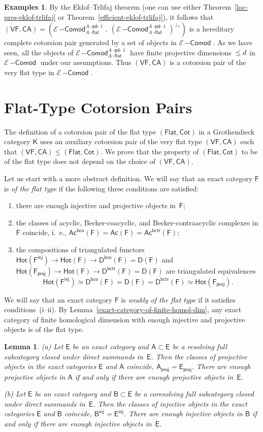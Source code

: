 \documentclass[12pt,a4paper]{amsart}
\newcommand{\+}{\nobreakdash-}
\renewcommand{\:}{\colon}
\newcommand{\rarrow}{\longrightarrow}
\newcommand{\Comodl}{{\operatorname{\mathsf{--Comod}}}}
\newcommand{\sA}{\mathsf A}
\newcommand{\sB}{\mathsf B}
\newcommand{\sD}{\mathsf D}
\newcommand{\sE}{\mathsf E}
\newcommand{\sF}{\mathsf F}
\newcommand{\sK}{\mathsf K}
\newcommand{\cE}{\mathcal E}
\newcommand{\VF}{\mathsf{VF}}
\newcommand{\CA}{\mathsf{CA}}
\newcommand{\Flat}{\mathsf{Flat}}
\newcommand{\Cot}{\mathsf{Cot}}
\newcommand{\Hot}{\mathsf{Hot}}
\newcommand{\Ac}{\mathsf{Ac}}
\newcommand{\proj}{\mathsf{proj}}
\newcommand{\inj}{\mathsf{inj}}
\newcommand{\bco}{\mathsf{bco}}
\newcommand{\bctr}{\mathsf{bctr}}
\newcommand{\dpdo}{{{\operatorname{\mathsf{-pd-}}}1}}
\newcommand{\dflat}{{\operatorname{\mathsf{-flat}}}}
\newcommand{\Section}[1]{\bigskip\section{#1}\medskip}
\theoremstyle{plain}
\newtheorem{lem}[thm]{Lemma}
\theoremstyle{definition}
\newtheorem{exs}[thm]{Examples}
\begin{document}
\begin{exs}
 By the Eklof--Trlifaj theorem (one can use either
Theorem~\ref{loc-pres-eklof-trlifaj} or
Theorem~\ref{efficient-eklof-trlifaj}), it follows that
$(\VF,\CA)=(\cE\Comodl^{A\dpdo}_{A\dflat},\allowbreak\>
(\cE\Comodl^{A\dpdo}_{A\dflat})^{\perp_1})$ is a hereditary complete
cotorsion pair generated by a set of objects in $\cE\Comodl$.
 As we have seen, all the objects of $\cE\Comodl^{A\dpdo}_{A\dflat}$
have finite projective dimensions~$\le\nobreak d$ in $\cE\Comodl$
under our assumptions.
 Thus $(\VF,\CA)$ is a cotorsion pair of the very flat type in
$\cE\Comodl$.
\end{exs}


\Section{Flat-Type Cotorsion Pairs}  \label{flat-type-secn}

 The definition of a cotorsion pair of the flat type $(\Flat,\Cot)$ in
a Grothendieck category $\sK$ uses an auxiliary cotorsion pair of
the very flat type $(\VF,\CA)$ such that $(\VF,\CA)\le(\Flat,\Cot)$.
 We prove that the property of $(\Flat,\Cot)$ to be of the flat type
does not depend on the choice of $(\VF,\CA)$.

 Let us start with a more abstract definition.
 We will say that an exact category $\sF$ is \emph{of the flat type} if
the following three conditions are satisfied:
\begin{enumerate}
\renewcommand{\theenumi}{\roman{enumi}}
\item there are enough injective and projective objects in~$\sF$;
\item the classes of acyclic, Becker-coacyclic, and
Becker-contraacyclic complexes in $\sF$ coincide, i.~e.,
$\Ac^\bco(\sF)=\Ac(\sF)=\Ac^\bctr(\sF)$;
\item the compositions of triangulated functors
$\Hot(\sF^\inj)\rarrow\Hot(\sF)\rarrow\sD^\bco(\sF)=\sD(\sF)$
and $\Hot(\sF_\proj)\rarrow\Hot(\sF)\rarrow\sD^\bctr(\sF)=\sD(\sF)$
are triangulated equivalences
$$
 \Hot(\sF^\inj)\simeq\sD^\bco(\sF)=\sD(\sF)=\sD^\bctr(\sF)\simeq
 \Hot(\sF_\proj).
$$
\end{enumerate}
 We will say that an exact category $\sF$ is \emph{weakly of the flat
type} if it satisfies conditions~(i\+-ii).
 By Lemma~\ref{exact-category-of-finite-homol-dim}, any exact
category of finite homological dimension with enough injective and
projective objects is of the flat type.

\begin{lem} \label{proj-resolving-inj-coresolving}
\textup{(a)} Let\/ $\sE$ be an exact category and\/ $\sA\subset\sE$
be a resolving full subcategory closed under direct summands in\/~$\sE$.
 Then the classes of projective objects in the exact categories\/ $\sE$
and\/ $\sA$ coincide, $\sA_\proj=\sE_\proj$.
 There are enough projective objects in\/ $\sA$ if and only if
there are enough projective objects in\/~$\sE$. \par
\textup{(b)} Let\/ $\sE$ be an exact category and\/ $\sB\subset\sE$ be
a coresolving full subcategory closed under direct summands in\/~$\sE$.
 Then the classes of injective objects in the exact categories\/ $\sE$
and\/ $\sB$ coincide, $\sB^\inj=\sE^\inj$.
 There are enough injective objects in\/ $\sB$ if and only if
there are enough injective objects in\/~$\sE$.
\end{lem}
\end{document}

